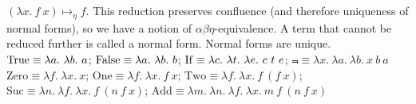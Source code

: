  $(\lambda x.\ f\ x) \mapsto_\eta f$. This reduction preserves confluence (and therefore uniqueness of normal forms), so we have a notion of $\alpha\beta\eta$-equivalence.
 A term that cannot be reduced further is called a normal form. Normal forms are unique.
 $\True \equiv \lambda a.\ \lambda b.\ a$; 
$\operatorname{False} \equiv \lambda a.\ \lambda b.\ b$; 
$\operatorname{If} \equiv \lambda c.\ \lambda t.\ \lambda e.\ c\ t\ e$;
$\Not \equiv \lambda x.\ \lambda a.\ \lambda b.\ x\ b\ a$
 $\mathrm{Zero} \equiv \lambda f.\ \lambda x.\ x$; 
$\mathrm{One} \equiv \lambda f.\ \lambda x.\ f\ x$; 
$\mathrm{Two} \equiv \lambda f.\ \lambda x.\ f\ (f\ x)$; 
$\mathrm{Suc} \equiv \lambda n.\ \lambda f.\ \lambda x.\ f\ (n\ f\ x)$; 
$\mathrm{Add} \equiv \lambda m.\ \lambda n.\ \lambda f.\ \lambda x.\ m\ f\ (n\ f\ x)$